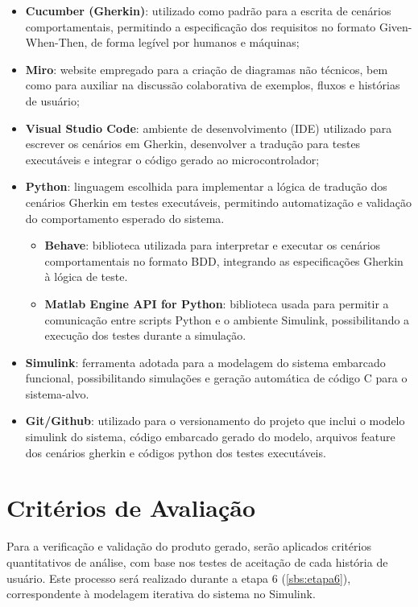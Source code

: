\begin{itemize}
    \item \textbf{Cucumber (Gherkin)}: utilizado como padrão para a escrita de cenários comportamentais, permitindo a especificação dos requisitos no formato Given-When-Then, de forma legível por humanos e máquinas;
    \item \textbf{Miro}: website empregado para a criação de diagramas não técnicos, bem como para auxiliar na discussão colaborativa de exemplos, fluxos e histórias de usuário;
    \item \textbf{Visual Studio Code}: ambiente de desenvolvimento (IDE) utilizado para escrever os cenários em Gherkin, desenvolver a tradução para testes executáveis e integrar o código gerado ao microcontrolador;
    \item \textbf{Python}: linguagem escolhida para implementar a lógica de tradução dos cenários Gherkin em testes executáveis, permitindo automatização e validação do comportamento esperado do sistema.
    \begin{itemize}
        \item \textbf{Behave}: biblioteca utilizada para interpretar e executar os cenários comportamentais no formato BDD, integrando as especificações Gherkin à lógica de teste.
        \item \textbf{Matlab Engine API for Python}: biblioteca usada para permitir a comunicação entre scripts Python e o ambiente Simulink, possibilitando a execução dos testes durante a simulação.
    \end{itemize}    
    \item \textbf{Simulink}: ferramenta adotada para a modelagem do sistema embarcado funcional, possibilitando simulações e geração automática de código C para o sistema-alvo.
    \item \textbf{Git/Github}: utilizado para o versionamento do projeto que inclui o modelo simulink do sistema, código embarcado gerado do modelo, arquivos feature dos cenários gherkin e códigos python dos testes executáveis.

\end{itemize}

\section{\textbf{Critérios de Avaliação}}
Para a verificação e validação do produto gerado, serão aplicados critérios quantitativos de análise, com base nos testes de aceitação de cada história de usuário. Este 
processo será realizado durante a etapa 6 (\ref{sbs:etapa6}), correspondente à modelagem iterativa do sistema no Simulink.

